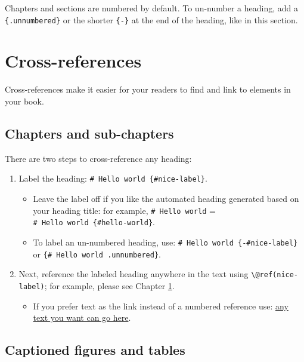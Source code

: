 \documentclass[
]{book}
\providecommand{\tightlist}{%
  \setlength{\itemsep}{0pt}\setlength{\parskip}{0pt}}
\theoremstyle{definition}
\theoremstyle{definition}
\theoremstyle{definition}
\theoremstyle{definition}
\theoremstyle{remark}
\begin{document}
Chapters and sections are numbered by default. To un-number a heading, add a \texttt{\{.unnumbered\}} or the shorter \texttt{\{-\}} at the end of the heading, like in this section.

\chapter{Cross-references}\label{cross}

Cross-references make it easier for your readers to find and link to elements in your book.

\section{Chapters and sub-chapters}\label{chapters-and-sub-chapters}

There are two steps to cross-reference any heading:

\begin{enumerate}
\def\labelenumi{\arabic{enumi}.}
\tightlist
\item
  Label the heading: \texttt{\#\ Hello\ world\ \{\#nice-label\}}.

  \begin{itemize}
  \tightlist
  \item
    Leave the label off if you like the automated heading generated based on your heading title: for example, \texttt{\#\ Hello\ world} = \texttt{\#\ Hello\ world\ \{\#hello-world\}}.
  \item
    To label an un-numbered heading, use: \texttt{\#\ Hello\ world\ \{-\#nice-label\}} or \texttt{\{\#\ Hello\ world\ .unnumbered\}}.
  \end{itemize}
\item
  Next, reference the labeled heading anywhere in the text using \texttt{\textbackslash{}@ref(nice-label)}; for example, please see Chapter \ref{cross}.

  \begin{itemize}
  \tightlist
  \item
    If you prefer text as the link instead of a numbered reference use: \hyperref[cross]{any text you want can go here}.
  \end{itemize}
\end{enumerate}

\section{Captioned figures and tables}\label{captioned-figures-and-tables}
\end{document}
